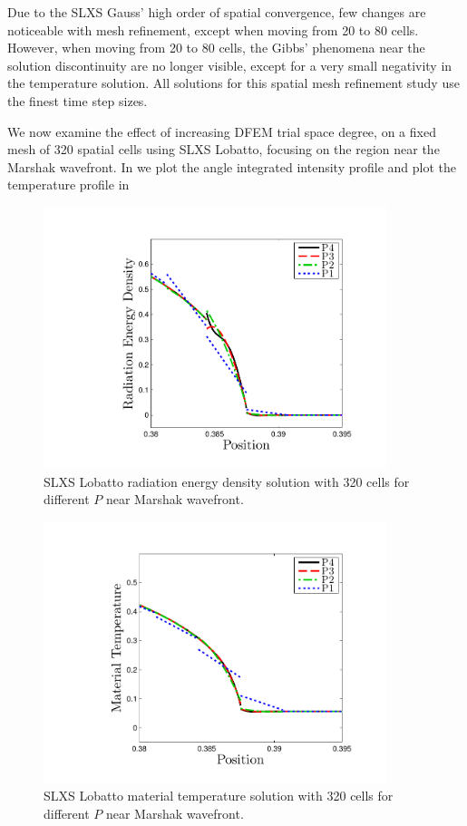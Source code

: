 Due to the SLXS Gauss' high order of spatial convergence, few changes are noticeable with mesh refinement, except when moving from 20 to 80 cells.
However, when moving from 20 to 80 cells, the Gibbs' phenomena near the solution discontinuity are no longer visible, except for a very small negativity in the temperature solution.
All solutions for this spatial mesh refinement study use the finest time step sizes.

We now examine the effect of increasing DFEM trial space degree, on a fixed mesh of 320 spatial cells using SLXS Lobatto, focusing on the region near the Marshak wavefront.
In  we plot the angle integrated intensity profile and plot the temperature profile in 
\begin{figure}[!htp]
\centering
\includegraphics[width=10cm,trim=1.0in  0.2in 0.5in 0.5in,clip=true]{chapter6_grey_radtran/Dissertation_Data/Pointless_Marshak_Zoom_Radiation_Lobatto_P_Refinement.pdf}
\caption{SLXS Lobatto radiation energy density solution with 320 cells for different $P$ near Marshak wavefront.}
\label{fig:p_convergence_rad}
\end{figure}
%
\begin{figure}[!hbp]
\centering
\includegraphics[width=10cm,trim=1.0in  0.2in 0.5in 0.5in,clip=true]{chapter6_grey_radtran/Dissertation_Data/Pointless_Marshak_Zoom_Temperature_Lobatto_P_Refinement.pdf}
\caption{SLXS Lobatto material temperature solution with 320 cells for different $P$ near Marshak wavefront.}
\label{fig:p_convergence_temp}
\end{figure}
